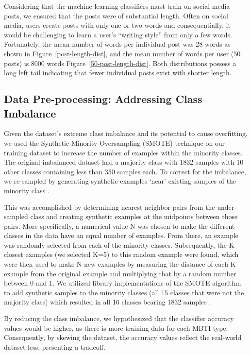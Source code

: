 \documentclass{article}
\begin{document}
Considering that the machine learning classifiers must train on social media posts, we ensured that the posts were of substantial length. Often on social media, users create posts with only one or two words and consequentially, it would be challenging to learn a user’s “writing style” from only a few words. Fortunately, the mean number of words per individual post was 28 words as shown in Figure~\ref{post-length-dist}, and the mean number of words per user (50 posts) is 8000 words Figure~\ref{50-post-length-dist}. Both distributions possess a long left tail indicating that fewer individual posts exist with shorter length.

\subsection{Data Pre-processing: Addressing Class Imbalance}

Given the dataset’s extreme class imbalance and its potential to cause overfitting, we used the Synthetic Minority Oversampling (SMOTE) technique on our training dataset to increase the number of examples within the minority classes. The original imbalanced dataset had a majority class with 1832 samples with 10 other classes containing less than 350 samples each. To correct for the imbalance, we re-sampled by generating synthetic examples ‘near’ existing samples of the minority class \cite{satpathy23}.

This was accomplished by determining nearest neighbor pairs from the under-sampled class and creating synthetic examples at the midpoints between those pairs. More specifically, a numerical value N was chosen to make the different classes in the data have an equal number of examples. From there, an example was randomly selected from each of the minority classes. Subsequently, the K closest examples (we selected K=5) to this random example were found, which were then used to make N new examples by measuring the distance of each K example from the original example and multiplying that by a random number between 0 and 1. We utilized library implementations of the SMOTE algorithm to add synthetic samples to the minority classes (all 15 classes that were not the majority class) which resulted in all 16 classes bearing 1832 samples \cite{satpathy23}.

By reducing the class imbalance, we hypothesized that the classifier accuracy values would be higher, as there is more training data for each MBTI type. Consequently, by skewing the dataset, the accuracy values reflect the real-world dataset less, presenting a tradeoff.
\end{document}
